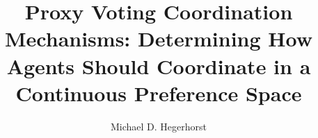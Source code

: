 \author{Michael D. Hegerhorst}
\title{
    Proxy Voting Coordination Mechanisms: Determining How Agents Should Coordinate in a Continuous Preference Space
}



